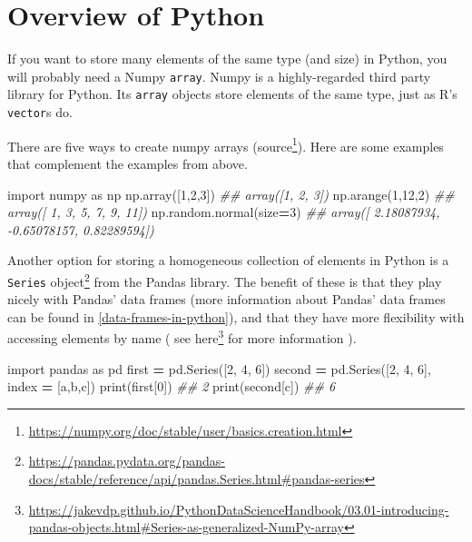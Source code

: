 \documentclass[
  12pt,
]{krantz}
\makeatletter
\newenvironment{Shaded}{\begin{snugshade}}{\end{snugshade}}
\newcommand{\BuiltInTok}[1]{#1}
\newcommand{\CommentTok}[1]{\textcolor[rgb]{0.37,0.37,0.37}{\textit{#1}}}
\newcommand{\DecValTok}[1]{\textcolor[rgb]{0.06,0.06,0.06}{#1}}
\newcommand{\ImportTok}[1]{#1}
\newcommand{\NormalTok}[1]{#1}
\newcommand{\OperatorTok}[1]{\textcolor[rgb]{0.43,0.43,0.43}{\textbf{#1}}}
\newcommand{\StringTok}[1]{\textcolor[rgb]{0.5,0.5,0.5}{#1}}
\renewcommand{\href}[2]{#2\footnote{\url{#1}}}
\newenvironment{kframe}{%
\medskip{}
\setlength{\fboxsep}{.8em}
 \def\at@end@of@kframe{}%
 \ifinner\ifhmode%
  \def\at@end@of@kframe{\end{minipage}}%
  \begin{minipage}{\columnwidth}%
 \fi\fi%
 \def\FrameCommand##1{\hskip\@totalleftmargin \hskip-\fboxsep
 \colorbox{shadecolor}{##1}\hskip-\fboxsep
     \hskip-\linewidth \hskip-\@totalleftmargin \hskip\columnwidth}%
 \MakeFramed {\advance\hsize-\width
   \@totalleftmargin\z@ \linewidth\hsize
   \@setminipage}}%
 {\par\unskip\endMakeFramed%
 \at@end@of@kframe}
\renewenvironment{Shaded}{\begin{kframe}}{\end{kframe}}
\makeatother
\begin{document}
\hypertarget{overview-of-python}{%
\section{Overview of Python}\label{overview-of-python}}

If you want to store many elements of the same type (and size) in Python, you will probably need a Numpy \texttt{array}. Numpy is a highly-regarded third party library \citep{harris2020array} for Python. Its \texttt{array} objects store elements of the same type, just as R's \texttt{vector}s do.

There are five ways to create numpy arrays (\href{https://numpy.org/doc/stable/user/basics.creation.html}{source}). Here are some examples that complement the examples from above.

\begin{Shaded}
\begin{Highlighting}[]
\ImportTok{import}\NormalTok{ numpy }\ImportTok{as}\NormalTok{ np   }
\NormalTok{np.array([}\DecValTok{1}\NormalTok{,}\DecValTok{2}\NormalTok{,}\DecValTok{3}\NormalTok{])}
\CommentTok{\#\# array([1, 2, 3])}
\NormalTok{np.arange(}\DecValTok{1}\NormalTok{,}\DecValTok{12}\NormalTok{,}\DecValTok{2}\NormalTok{)}
\CommentTok{\#\# array([ 1,  3,  5,  7,  9, 11])}
\NormalTok{np.random.normal(size}\OperatorTok{=}\DecValTok{3}\NormalTok{)}
\CommentTok{\#\# array([ 2.18087934, {-}0.65078157,  0.82289594])}
\end{Highlighting}
\end{Shaded}

Another option for storing a homogeneous collection of elements in Python is a \href{https://pandas.pydata.org/pandas-docs/stable/reference/api/pandas.Series.html\#pandas-series}{\texttt{Series} object} from the Pandas library. The benefit of these is that they play nicely with Pandas' data frames (more information about Pandas' data frames can be found in \ref{data-frames-in-python}), and that they have more flexibility with accessing elements by name ( see \href{https://jakevdp.github.io/PythonDataScienceHandbook/03.01-introducing-pandas-objects.html\#Series-as-generalized-NumPy-array}{here} for more information ).

\begin{Shaded}
\begin{Highlighting}[]
\ImportTok{import}\NormalTok{ pandas }\ImportTok{as}\NormalTok{ pd}
\NormalTok{first }\OperatorTok{=}\NormalTok{ pd.Series([}\DecValTok{2}\NormalTok{, }\DecValTok{4}\NormalTok{, }\DecValTok{6}\NormalTok{])}
\NormalTok{second }\OperatorTok{=}\NormalTok{ pd.Series([}\DecValTok{2}\NormalTok{, }\DecValTok{4}\NormalTok{, }\DecValTok{6}\NormalTok{], index }\OperatorTok{=}\NormalTok{ [}\StringTok{\textquotesingle{}a\textquotesingle{}}\NormalTok{,}\StringTok{\textquotesingle{}b\textquotesingle{}}\NormalTok{,}\StringTok{\textquotesingle{}c\textquotesingle{}}\NormalTok{])}
\BuiltInTok{print}\NormalTok{(first[}\DecValTok{0}\NormalTok{])}
\CommentTok{\#\# 2}
\BuiltInTok{print}\NormalTok{(second[}\StringTok{\textquotesingle{}c\textquotesingle{}}\NormalTok{])}
\CommentTok{\#\# 6}
\end{Highlighting}
\end{Shaded}
\end{document}
